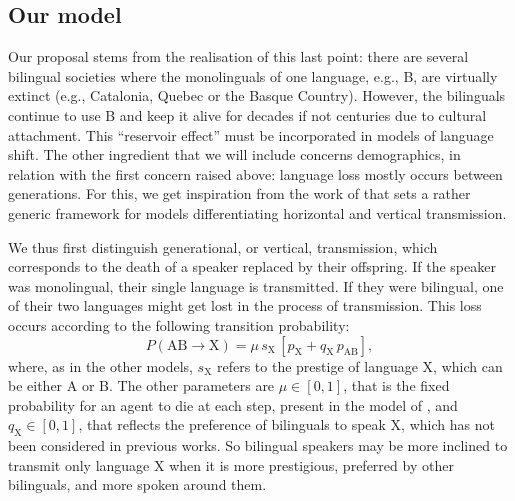\documentclass[../thesis.tex]{subfiles}
\begin{document}
\subsection{Our model}
Our proposal stems from the realisation of this last point: there are several bilingual
societies where the monolinguals of one language, e.g., B, are virtually extinct (e.g.,
Catalonia, Quebec or the Basque Country). However, the bilinguals continue to use B and
keep it alive for decades if not centuries due to cultural attachment. This ``reservoir
effect'' must be incorporated in models of language shift. The other ingredient that we
will include concerns demographics, in relation with the first concern raised above:
language loss mostly occurs between generations. For this, we get inspiration from the
work of \cite{MinettModellingEndangered2008} that sets a rather generic framework for
models differentiating horizontal and vertical transmission.

We thus first distinguish generational, or vertical, transmission, which corresponds to
the death of a speaker replaced by their offspring. If the speaker was monolingual,
their single language is transmitted. If they were bilingual, one of their two languages
might get lost in the process of transmission. This loss occurs according to the
following transition probability:
\begin{equation}
  P (\text{AB} \rightarrow \text{X}) = \mu \, s_\text{X} \, \left[ p_{\text{X}} + q_\text{X} \, p_{\text{AB}} \right],
\end{equation}
where, as in the other models, $s_\text{X}$ refers to the prestige of language X, which
can be either A or B. The other parameters are $\mu \in [0, 1]$, that is the fixed
probability for an agent to die at each step, present in the model of
\cite{MinettModellingEndangered2008}, and $q_\text{X} \in [0, 1]$, that reflects the
preference of bilinguals to speak X, which has not been considered in previous works. So
bilingual speakers may be more inclined to transmit only language X when it is more
prestigious, preferred by other bilinguals, and more spoken around them.
\end{document}
